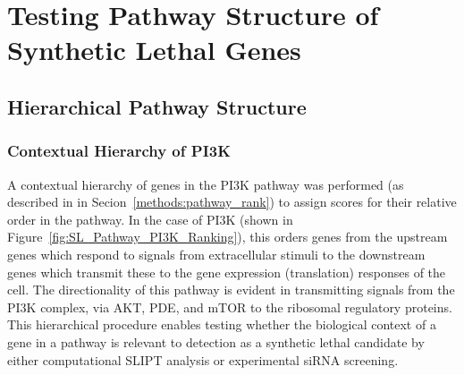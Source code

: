 \begin{table*}[!htb]
\caption{\gls{ANOVA} for Synthetic Lethality and PageRank Centrality}
\label{tab:SL_Pathway_PI3K_PageRank}
\noindent{}
\end{table*}

\FloatBarrier

\section{Testing Pathway Structure of Synthetic Lethal Genes}

\FloatBarrier

\subsection{Hierarchical Pathway Structure}

\subsubsection{Contextual Hierarchy of PI3K}  \label{chapt4:Network_Hierachy}

\FloatBarrier

A contextual hierarchy of genes in the PI3K pathway was performed (as described in in Secion~\ref{methods:pathway_rank}) to assign scores for their relative order in the pathway. In the case of PI3K (shown in Figure~\ref{fig:SL_Pathway_PI3K_Ranking}), this orders genes from the upstream genes which respond to signals from extracellular stimuli to the downstream genes which transmit these to the gene expression (translation) responses of the cell. The directionality of this pathway is evident in transmitting signals from the \gls{PI3K} complex, via AKT, \gls{PDE}, and mTOR to the ribosomal regulatory proteins. This hierarchical procedure enables testing whether the biological context of a gene in a pathway is relevant to detection as a synthetic lethal candidate by either computational \gls{SLIPT} analysis or experimental \gls{siRNA} screening.

